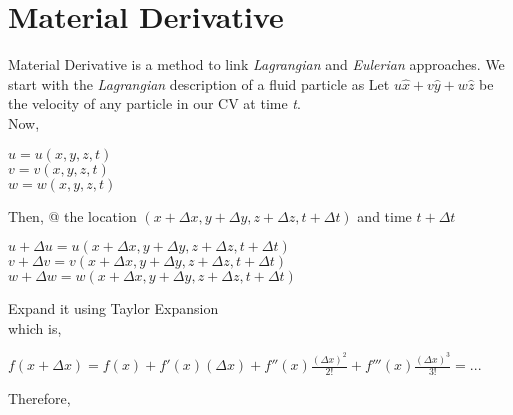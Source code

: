 \documentclass{book}
\begin{document}
\section{Material Derivative}
Material Derivative is a method to link \emph{Lagrangian} and \emph{Eulerian} approaches. We start with the \emph{Lagrangian} description of a fluid particle as \textemdash 
Let
$u\hat{x}+v\hat{y}+w\hat{z}$ be the velocity of any particle in our CV at time \emph{t}.\\
Now,
 \begin{center}
$u=u(x,y,z,t)$ \\
$v=v(x,y,z,t)$ \\
$w=w(x,y,z,t)$ \\
\end{center}
Then,
@ the location $(x+\Delta x,y+\Delta y,z+\Delta z,t+\Delta t)$ and time $t+\Delta t$ \textemdash 
\\
\begin{center}
$u+\Delta u=u(x+\Delta x,y+\Delta y,z+\Delta z,t+\Delta t)$
\\
$v+\Delta v=v(x+\Delta x,y+\Delta y,z+\Delta z,t+\Delta t)$
\\
$w+\Delta w=w(x+\Delta x,y+\Delta y,z+\Delta z,t+\Delta t)$
\end{center}
Expand it using Taylor Expansion \textemdash
\\
which is,
\begin{center}
$f(x+\Delta x)=f(x)+f'(x)(\Delta x)+f''(x)\frac{(\Delta x)^2}{2!}+f'''(x)\frac{(\Delta x)^3}{3!}=...$
\\

\end{center}
Therefore,
\end{document}

